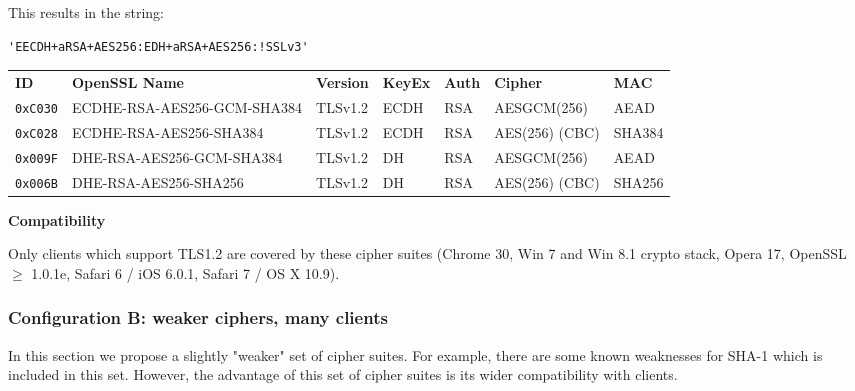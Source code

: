 This results in the string:

\begin{lstlisting}[breaklines]
'EECDH+aRSA+AES256:EDH+aRSA+AES256:!SSLv3'
\end{lstlisting}

%



\begin{center}

\begin{tabular}{lllllll}
\toprule
\textbf{ID}   & \textbf{OpenSSL Name}       & \textbf{Version} & \textbf{KeyEx} & \textbf{Auth} & \textbf{Cipher} & \textbf{MAC}\\\cmidrule(lr){1-7}
\verb|0xC030| & ECDHE-RSA-AES256-GCM-SHA384 & TLSv1.2          & ECDH           &  RSA          & AESGCM(256)     & AEAD         \\
\verb|0xC028| & ECDHE-RSA-AES256-SHA384     & TLSv1.2          & ECDH           &  RSA          & AES(256) (CBC)  & SHA384       \\
\verb|0x009F| & DHE-RSA-AES256-GCM-SHA384   & TLSv1.2          & DH             &  RSA          & AESGCM(256)     & AEAD         \\
\verb|0x006B| & DHE-RSA-AES256-SHA256       & TLSv1.2          & DH             &  RSA          & AES(256) (CBC)  & SHA256       \\
\bottomrule
\end{tabular}
\end{center}


\textbf{Compatibility}

Only clients which support TLS1.2 are covered by these cipher suites (Chrome 30,
Win 7 and Win 8.1 crypto stack, Opera 17, OpenSSL $\ge$ 1.0.1e, Safari 6 / iOS
6.0.1, Safari 7 / OS X 10.9).



\subsubsection{Configuration B: weaker ciphers, many clients}

In this section we propose a slightly "weaker" set of cipher suites. For example, there are
some known weaknesses for SHA-1 which is included in this set.
However, the advantage of this set of cipher suites is its wider compatibility
with clients. 



